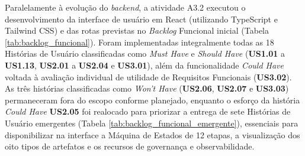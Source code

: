 Paralelamente à evolução do \textit{backend}, a atividade A3.2 executou o desenvolvimento da interface de usuário em React (utilizando TypeScript e Tailwind CSS) e das rotas previstas no \textit{Backlog} Funcional inicial (Tabela \ref{tab:backlog_funcional}). Foram implementadas integralmente todas as 18 Histórias de Usuário classificadas como \textit{Must Have} e \textit{Should Have} (\textbf{US1.01} a \textbf{US1.13}, \textbf{US2.01} a \textbf{US2.04} e \textbf{US3.01}), além da funcionalidade \textit{Could Have} voltada à avaliação individual de utilidade de Requisitos Funcionais (\textbf{US3.02}). As três histórias classificadas como \textit{Won't Have} (\textbf{US2.06}, \textbf{US2.07} e \textbf{US3.03}) permaneceram fora do escopo conforme planejado, enquanto o esforço da história \textit{Could Have} \textbf{US2.05} foi realocado para priorizar a entrega de sete Histórias de Usuário emergentes (Tabela \ref{tab:backlog_funcional_emergente}), essenciais para disponibilizar na interface a Máquina de Estados de 12 etapas, a visualização dos oito tipos de artefatos e os recursos de governança e observabilidade.

